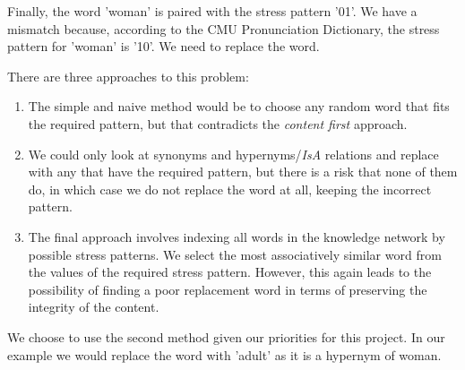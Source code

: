 Finally, the word 'woman' is paired with the stress pattern '01'. We have a mismatch because, according to the CMU Pronunciation Dictionary, the stress pattern for 'woman' is '10'. We need to replace the word.

There are three approaches to this problem:
\begin{enumerate}
\item{The simple and naive method would be to choose any random word that fits the required pattern, but that contradicts the \textit{content first} approach.} 
\item{We could only look at synonyms and hypernyms/\textit{IsA} relations and replace with any that have the required pattern, but there is a risk that none of them do, in which case we do not replace the word at all, keeping the incorrect pattern.} 
\item{The final approach involves indexing all words in the knowledge network by possible stress patterns. We select the most associatively similar word from the values of the required stress pattern. However, this again leads to the possibility of finding a poor replacement word in terms of preserving the integrity of the content.}
\end{enumerate}

We choose to use the second method given our priorities for this project. In our example we would replace the word with 'adult' as it is a hypernym of woman.





